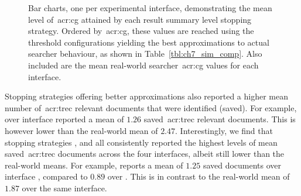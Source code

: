 \begin{figure}[p!]
    \centering
    \caption[Simulated and real-world~\gls{acr:cg} rankings]{Bar charts, one per experimental interface, demonstrating the mean level of~\gls{acr:cg} attained by each result summary level stopping strategy. Ordered by~\gls{acr:cg}, these values are reached using the threshold configurations yielding the best approximations to actual searcher behaviour, as shown in Table~\ref{tbl:ch7_sim_comp}. Also included are the mean real-world searcher~\gls{acr:cg} values for each interface.}
    \label{fig:ch7_sim_comparison_rankings}
\end{figure}

Stopping strategies offering better approximations also reported a higher mean number of~\gls{acr:trec} relevant documents that were identified (saved). For example,  over interface  reported a mean of $1.26$ saved~\gls{acr:trec} relevant documents. This is however lower than the real-world mean of $2.47$. Interestingly, we find that stopping strategies ,  and  all consistently reported the highest levels of mean saved~\gls{acr:trec} documents across the four interfaces, albeit still lower than the real-world means. For example,  reports a mean of $1.25$ saved documents over interface , compared to $0.89$ over . This is in contrast to the real-world mean of $1.87$ over the same interface.

